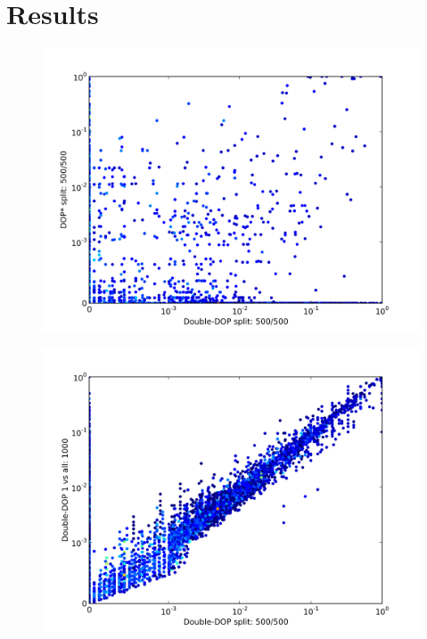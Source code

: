 \section{Results}\label{sec:Results}

\begin{figure}
\center
\includegraphics[width=\linewidth]{../data/plots/plot0}
\end{figure}


\begin{figure}
\center
\includegraphics[width=\linewidth]{../data/plots/plot1}
\end{figure}


